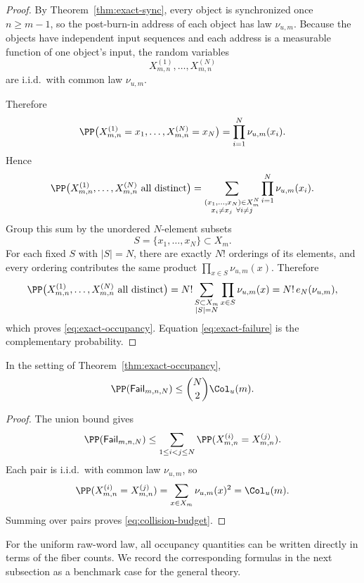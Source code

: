 \begin{proof}
By Theorem~\ref{thm:exact-sync}, every object is synchronized once $n\ge m-1$, so the post-burn-in address of each object has law $\nu_{u,m}$. Because the objects have independent input sequences and each address is a measurable function of one object's input, the random variables
\[
X^{(1)}_{m,n},\dots,X^{(N)}_{m,n}
\]
are i.i.d.\ with common law $\nu_{u,m}$.

Therefore
\[
\PP\bigl(X^{(1)}_{m,n}=x_1,\dots,X^{(N)}_{m,n}=x_N\bigr)=\prod_{i=1}^N \nu_{u,m}(x_i).
\]
Hence
\[
\PP\bigl(X^{(1)}_{m,n},\dots,X^{(N)}_{m,n}\text{ all distinct}\bigr)
=
\sum_{\substack{(x_1,\dots,x_N)\in X_m^N\\x_i\neq x_j\ \forall i\neq j}}
\prod_{i=1}^N \nu_{u,m}(x_i).
\]
Group this sum by the unordered $N$-element subsets
\[
S=\{x_1,\dots,x_N\}\subset X_m.
\]
For each fixed $S$ with $|S|=N$, there are exactly $N!$ orderings of its elements, and every ordering contributes the same product $\prod_{x\in S}\nu_{u,m}(x)$. Therefore
\[
\PP\bigl(X^{(1)}_{m,n},\dots,X^{(N)}_{m,n}\text{ all distinct}\bigr)
=
N!\sum_{\substack{S\subset X_m\\|S|=N}}
\prod_{x\in S}\nu_{u,m}(x)
=
N!\,e_N(\nu_{u,m}),
\]
which proves \eqref{eq:exact-occupancy}. Equation \eqref{eq:exact-failure} is the complementary probability.
\end{proof}

\begin{corollary}\label{cor:collision-budget}
In the setting of Theorem~\ref{thm:exact-occupancy},
\begin{equation}\label{eq:collision-budget}
\PP(\mathsf{Fail}_{m,n,N})\le \binom{N}{2}\Col_u(m).
\end{equation}
\end{corollary}

\begin{proof}
The union bound gives
\[
\PP(\mathsf{Fail}_{m,n,N})\le \sum_{1\le i<j\le N}\PP(X^{(i)}_{m,n}=X^{(j)}_{m,n}).
\]
Each pair is i.i.d.\ with common law $\nu_{u,m}$, so
\[
\PP(X^{(i)}_{m,n}=X^{(j)}_{m,n})=\sum_{x\in X_m}\nu_{u,m}(x)^2=\Col_u(m).
\]
Summing over pairs proves \eqref{eq:collision-budget}.
\end{proof}

For the uniform raw-word law, all occupancy quantities can be written directly in terms of the fiber counts. We record the corresponding formulas in the next subsection as a benchmark case for the general theory.
